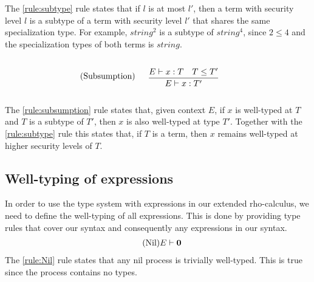 The \ref{rule:subtype} rule states that if $l$ is at most $l'$, then a term with security level $l$ is a subtype of a term with security level $l'$ that shares the same specialization type.
For example, $string^2$ is a subtype of $string^4$, since $2\leq4$ and the specialization types of both terms is $string$.

\begin{align*}
\tag{Subsumption}\label{rule:subsumption} &\infrule{E\vdash x:T\quad T\leq T'}{E\vdash x:T'}
\end{align*}

The \ref{rule:subsumption} rule states that, given context $E$, if $x$ is well-typed at $T$ and $T$ is a subtype of $T'$, then $x$ is also well-typed at type $T'$.
Together with the \ref{rule:subtype} rule this states that, if $T$ is a term, then $x$ remains well-typed at higher security levels of $T$.


\subsection{Well-typing of expressions}
In order to use the type system with expressions in our extended rho-calculus, we need to define the well-typing of all expressions.
This is done by providing type rules that cover our syntax and consequently any expressions in our syntax.
\begin{align*}
\tag{Nil}\label{rule:Nil} &E \vdash \mathbf{0}
\end{align*}
The \ref{rule:Nil} rule states that any nil process is trivially well-typed.
This is true since the process contains no types.


